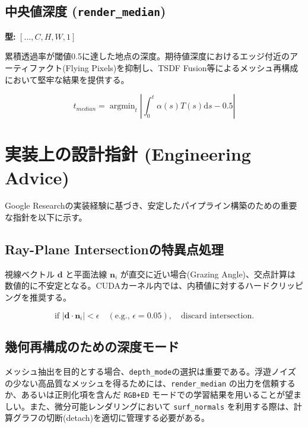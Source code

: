 \subsection{中央値深度 (\texttt{render\_median})}
\textbf{型:} $[..., C, H, W, 1]$

累積透過率が閾値0.5に達した地点の深度。期待値深度におけるエッジ付近のアーティファクト(Flying Pixels)を抑制し、TSDF Fusion等によるメッシュ再構成において堅牢な結果を提供する。

\begin{equation}
    t_{median} = \mathop{\mathrm{argmin}}_t \left| \int_{0}^{t} \alpha(s)T(s) \mathrm{d}s - 0.5 \right|
\end{equation}

\section{実装上の設計指針 (Engineering Advice)}

Google Researchの実装経験に基づき、安定したパイプライン構築のための重要な指針を以下に示す。

\subsection{Ray-Plane Intersectionの特異点処理}
視線ベクトル $\bm{d}$ と平面法線 $\bm{n}_i$ が直交に近い場合(Grazing Angle)、交点計算は数値的に不安定となる。CUDAカーネル内では、内積値に対するハードクリッピングを推奨する。

\begin{equation}
    \text{if } |\bm{d} \cdot \bm{n}_i| < \epsilon \quad (\text{e.g., } \epsilon=0.05), \quad \text{discard intersection.}
\end{equation}

\subsection{幾何再構成のための深度モード}
メッシュ抽出を目的とする場合、\texttt{depth\_mode}の選択は重要である。浮遊ノイズの少ない高品質なメッシュを得るためには、\texttt{render\_median} の出力を信頼するか、あるいは正則化項を含んだ \texttt{RGB+ED} モードでの学習結果を用いることが望ましい。また、微分可能レンダリングにおいて \texttt{surf\_normals} を利用する際は、計算グラフの切断(detach)を適切に管理する必要がある。